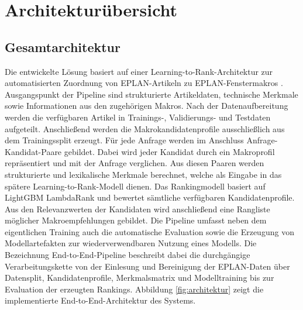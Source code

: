 
\chapter{Architekturübersicht}
\label{chap:architektur}

\section{Gesamtarchitektur} 

Die entwickelte Lösung basiert auf einer Learning-to-Rank-Architektur zur automatisierten Zuordnung von EPLAN-Artikeln \parencite{EPLANArtikelverwaltung} zu EPLAN-Fenstermakros \parencite{EPLAN-Makros}. 
Ausgangspunkt der Pipeline sind strukturierte Artikeldaten, technische Merkmale sowie Informationen aus den zugehörigen Makros. 
Nach der Datenaufbereitung werden die verfügbaren Artikel in Trainings-, Validierungs- und Testdaten aufgeteilt. 
Anschließend werden die Makrokandidatenprofile ausschließlich aus dem Trainingssplit erzeugt. Für jede Anfrage werden im Anschluss Anfrage-Kandidat-Paare gebildet.
Dabei wird jeder Kandidat durch ein Makroprofil repräsentiert und mit der Anfrage verglichen. Aus diesen Paaren werden strukturierte und lexikalische Merkmale berechnet, welche als Eingabe in das spätere Learning-to-Rank-Modell dienen. 
Das Rankingmodell basiert auf LightGBM LambdaRank und bewertet sämtliche verfügbaren Kandidatenprofile. Aus den Relevanzwerten der Kandidaten wird anschließend eine Rangliste möglicher Makroempfehlungen gebildet. 
Die Pipeline umfasst neben dem eigentlichen Training auch die automatische Evaluation sowie die Erzeugung von Modellartefakten zur wiederverwendbaren Nutzung eines Modells. 
Die Bezeichnung End-to-End-Pipeline beschreibt dabei die durchgängige Verarbeitungskette von der Einlesung und Bereinigung der EPLAN-Daten über Datensplit, Kandidatenprofile, Merkmalsmatrix und Modelltraining bis zur Evaluation der erzeugten Rankings. Abbildung \ref{fig:architektur} zeigt die implementierte End-to-End-Architektur des Systems.

